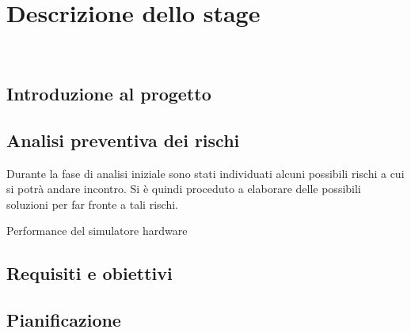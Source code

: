 \chapter{Descrizione dello stage}
\label{cap:descrizione-stage}

\\

\section{Introduzione al progetto}

\section{Analisi preventiva dei rischi}

Durante la fase di analisi iniziale sono stati individuati alcuni possibili rischi a cui si potrà andare incontro.
Si è quindi proceduto a elaborare delle possibili soluzioni per far fronte a tali rischi.\\

\begin{risk}{Performance del simulatore hardware}
    \label{risk:hardware-simulator}
\end{risk}

\section{Requisiti e obiettivi}


\section{Pianificazione}
